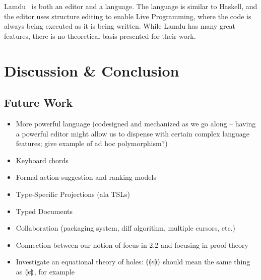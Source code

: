 \documentclass{llncs}
\begin{document}
Lamdu~\cite{lamdu} is both an editor and a language. The language is similar to Haskell, and the editor uses structure editing to enable Live Programming, where the code is always being executed as it is being written.
While Lamdu has many great features, there is no theoretical basis presented for their work.







%
%



\section{Discussion \& Conclusion}
\label{sec:future}
\subsection{Future Work}
\begin{itemize}
\item More powerful language (codesigned and mechanized as we go along -- having a powerful editor might allow us to dispense with certain complex language features; give example of ad hoc polymorphism?)
\item Keyboard chords
\item Formal action suggestion and ranking models
\item Type-Specific Projections (ala TSLs)
\item Typed Documents
\item Collaboration (packaging system, diff algorithm, multiple cursors, etc.)
\item Connection between our notion of focus in 2.2 and focusing in proof theory
\item Investigate an equational theory of holes: $\llparenthesis\llparenthesis e\rrparenthesis\rrparenthesis$ should
  mean the same thing as $\llparenthesis e\rrparenthesis$, for example
\end{itemize}
\end{document}
